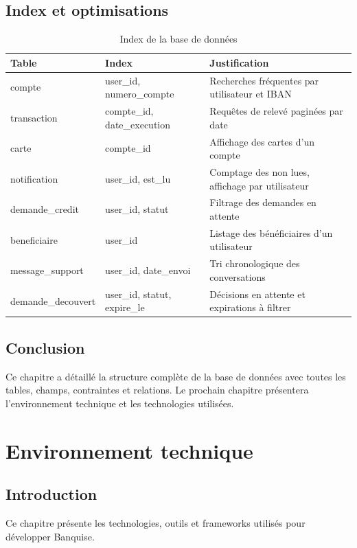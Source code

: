 \documentclass[12pt,a4paper]{report}
\begin{document}
\section{Index et optimisations}

\begin{table}[H]
\centering
\begin{tabular}{|p{4cm}|p{5cm}|p{5cm}|}
\hline
\rowcolor{banquiseblue!30}
\textbf{Table} & \textbf{Index} & \textbf{Justification} \\
\hline
compte & user\_id, numero\_compte & Recherches fréquentes par utilisateur et IBAN \\
\hline
transaction & compte\_id, date\_execution & Requêtes de relevé paginées par date \\
\hline
carte & compte\_id & Affichage des cartes d'un compte \\
\hline
notification & user\_id, est\_lu & Comptage des non lues, affichage par utilisateur \\
\hline
demande\_credit & user\_id, statut & Filtrage des demandes en attente \\
\hline
beneficiaire & user\_id & Listage des bénéficiaires d'un utilisateur \\
\hline
message\_support & user\_id, date\_envoi & Tri chronologique des conversations \\
\hline
demande\_decouvert & user\_id, statut, expire\_le & Décisions en attente et expirations à filtrer \\
\hline
\end{tabular}
\caption{Index de la base de données}
\end{table}

\section{Conclusion}
Ce chapitre a détaillé la structure complète de la base de données avec toutes les tables, champs, contraintes et relations. Le prochain chapitre présentera l'environnement technique et les technologies utilisées.

\chapter{Environnement technique}

\section{Introduction}
Ce chapitre présente les technologies, outils et frameworks utilisés pour développer Banquise.
\end{document}
